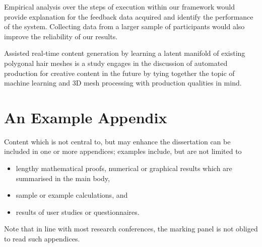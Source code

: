 \documentclass[ %
author={Dillon Keith Diep},
supervisor={Dr. Carl Henrik Ek},
degree={MEng},
title={ART-CG Hair:},
subtitle={Assisted Real-time Content Generation of Stylised Virtual Hair},
type={Research},
year={2017} ]{dissertation}
\begin{document}
Empirical analysis over the steps of execution within our framework would provide explanation for the feedback data acquired and identify the performance of the system. Collecting data from a larger sample of participants would also improve the reliability of our results.

Assisted real-time content generation by learning a latent manifold of existing polygonal hair meshes is a study engages in the discussion of automated production for creative content in the future by tying together the topic of machine learning and 3D mesh processing with production qualities in mind. 


%
%

\backmatter





\appendix

\chapter{An Example Appendix}
\label{appx:example}

Content which is not central to, but may enhance the dissertation can be 
included in one or more appendices; examples include, but are not limited
to

\begin{itemize}
	\item lengthy mathematical proofs, numerical or graphical results which 
	are summarised in the main body,
	\item sample or example calculations, 
	and
	\item results of user studies or questionnaires.
\end{itemize}

\noindent
Note that in line with most research conferences, the marking panel is not
obliged to read such appendices.

\end{document}
